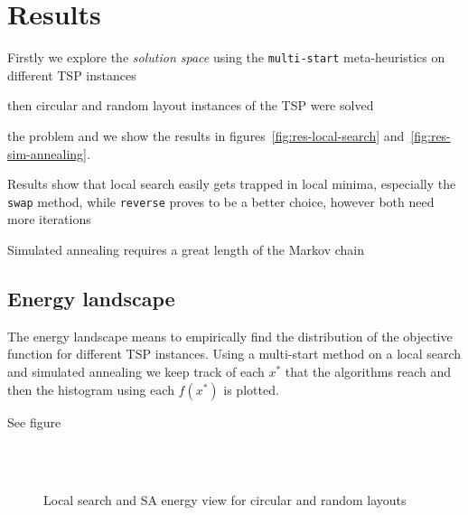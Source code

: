 \section{Results}\label{subsc:res}

Firstly we explore the \emph{solution space} using the \texttt{multi-start} meta-heuristics on different TSP instances

then circular and random layout instances of the TSP were solved

the problem and we show the results in figures~\ref{fig:res-local-search} and~\vref{fig:res-sim-annealing}.

Results show that local search easily gets trapped in local minima, especially the \texttt{swap} method, while \texttt{reverse} proves to be a better choice, however both need more iterations

Simulated annealing requires a great length of the Markov chain


\subsection{Energy landscape}\label{subsc:energy-land}

The energy landscape means to empirically find the distribution of the objective function for different TSP instances. Using a multi-start method on a local search and simulated annealing we keep track of each $x^\ast$ that the algorithms reach and then the histogram using each $f(x^\ast)$ is plotted.

See figure



\begin{figure}
\centering
{} \,
 \\
 \,
\caption{Local search and SA energy view for circular and random layouts}
\label{fig:res-energy}
\end{figure}



